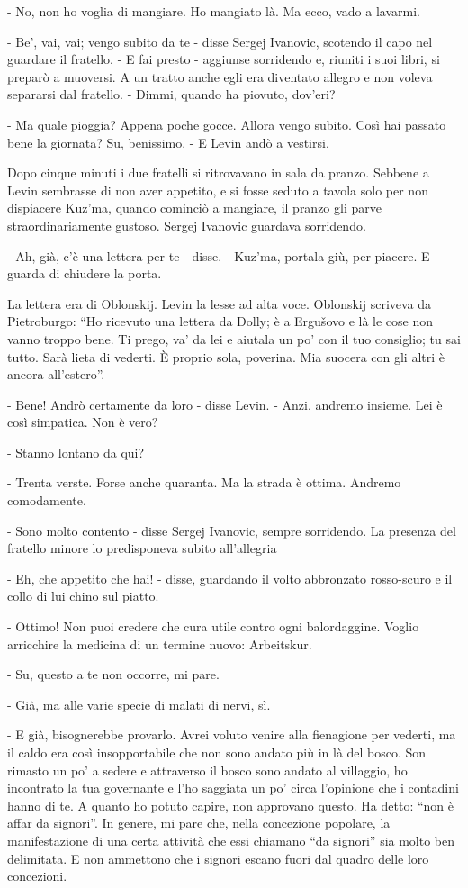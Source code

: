 - No, non ho voglia di mangiare. Ho mangiato là. Ma ecco, vado a lavarmi. 

- Be', vai, vai; vengo subito da te - disse Sergej Ivanovic, scotendo il capo nel guardare il fratello. - E fai presto - aggiunse sorridendo e, riuniti i suoi libri, si preparò a muoversi. A un tratto anche egli era diventato allegro e non voleva separarsi dal fratello. - Dimmi, quando ha piovuto, dov'eri? 

- Ma quale pioggia? Appena poche gocce. Allora vengo subito. Così hai passato bene la giornata? Su, benissimo. - E Levin andò a vestirsi. 

Dopo cinque minuti i due fratelli si ritrovavano in sala da pranzo. Sebbene a Levin sembrasse di non aver appetito, e si fosse seduto a tavola solo per non dispiacere Kuz'ma, quando cominciò a mangiare, il pranzo gli parve straordinariamente gustoso. Sergej Ivanovic guardava sorridendo. 

- Ah, già, c'è una lettera per te - disse. - Kuz'ma, portala giù, per piacere. E guarda di chiudere la porta. 

La lettera era di Oblonskij. Levin la lesse ad alta voce. Oblonskij scriveva da Pietroburgo: ``Ho ricevuto una lettera da Dolly; è a Ergušovo e là le cose non vanno troppo bene. Ti prego, va' da lei e aiutala un po' con il tuo consiglio; tu sai tutto. Sarà lieta di vederti. È proprio sola, poverina. Mia suocera con gli altri è ancora all'estero''. 

- Bene! Andrò certamente da loro - disse Levin. - Anzi, andremo insieme. Lei è così simpatica. Non è vero? 

- Stanno lontano da qui? 

- Trenta verste. Forse anche quaranta. Ma la strada è ottima. Andremo comodamente. 

- Sono molto contento - disse Sergej Ivanovic, sempre sorridendo. La presenza del fratello minore lo predisponeva subito all'allegria 

- Eh, che appetito che hai! - disse, guardando il volto abbronzato rosso-scuro e il collo di lui chino sul piatto. 

- Ottimo! Non puoi credere che cura utile contro ogni balordaggine. Voglio arricchire la medicina di un termine nuovo: Arbeitskur. 

- Su, questo a te non occorre, mi pare. 

- Già, ma alle varie specie di malati di nervi, sì. 

- E già, bisognerebbe provarlo. Avrei voluto venire alla fienagione per vederti, ma il caldo era così insopportabile che non sono andato più in là del bosco. Son rimasto un po' a sedere e attraverso il bosco sono andato al villaggio, ho incontrato la tua governante e l'ho saggiata un po' circa l'opinione che i contadini hanno di te. A quanto ho potuto capire, non approvano questo. Ha detto: ``non è affar da signori''. In genere, mi pare che, nella concezione popolare, la manifestazione di una certa attività che essi chiamano ``da signori'' sia molto ben delimitata. E non ammettono che i signori escano fuori dal quadro delle loro concezioni. 

